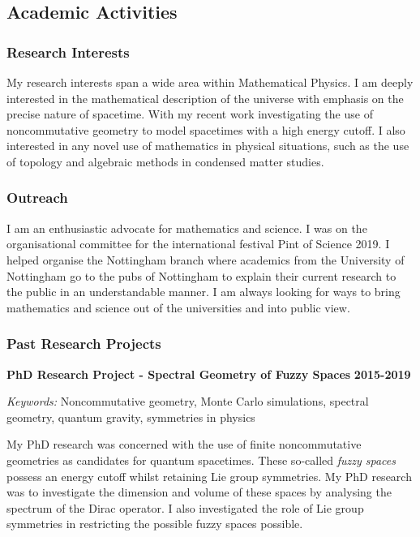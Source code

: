 \documentclass[a4paper,12pt]{article}
\begin{document}
\hypertarget{academic-activities}{%
\subsection{Academic Activities}\label{academic-activities}}

\hypertarget{research-interests}{%
\subsubsection{Research Interests}\label{research-interests}}

My research interests span a wide area within Mathematical Physics. I am
deeply interested in the mathematical description of the universe with
emphasis on the precise nature of spacetime. With my recent work
investigating the use of noncommutative geometry to model spacetimes
with a high energy cutoff. I also interested in any novel use of
mathematics in physical situations, such as the use of topology and
algebraic methods in condensed matter studies.

\hypertarget{outreach}{%
\subsubsection{Outreach}\label{outreach}}

I am an enthusiastic advocate for mathematics and science. I was on the
organisational committee for the international festival Pint of Science
2019. I helped organise the Nottingham branch where academics from the
University of Nottingham go to the pubs of Nottingham to explain their
current research to the public in an understandable manner. I am always
looking for ways to bring mathematics and science out of the
universities and into public view.

\hypertarget{past-research-projects}{%
\subsubsection{Past Research Projects}\label{past-research-projects}}

\textbf{PhD Research Project - Spectral Geometry of Fuzzy Spaces}
{\textbf{2015-2019}}

\emph{Keywords:} Noncommutative geometry, Monte Carlo simulations,
spectral geometry, quantum gravity, symmetries in physics

My PhD research was concerned with the use of finite noncommutative
geometries as candidates for quantum spacetimes. These so-called
\emph{fuzzy spaces} possess an energy cutoff whilst retaining Lie group
symmetries. My PhD research was to investigate the dimension and volume
of these spaces by analysing the spectrum of the Dirac operator. I also
investigated the role of Lie group symmetries in restricting the
possible fuzzy spaces possible.
\end{document}
